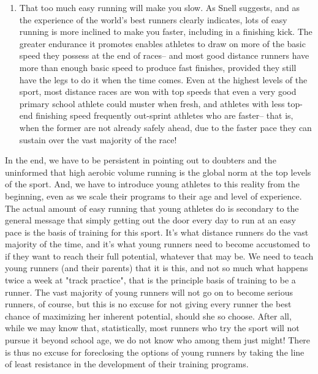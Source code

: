 \begin{enumerate}
    \item That too much easy running will make you slow. As Snell suggests, and as the experience of the world's best runners clearly indicates, lots of easy running is more inclined to make you faster, including in a finishing kick. The greater endurance it promotes enables athletes to draw on more of the basic speed they possess at the end of races-- and most good distance runners have more than enough basic speed to produce fast finishes, provided they still have the legs to do it when the time comes. Even at the highest levels of the sport, most distance races are won with top speeds that even a very good primary school athlete could muster when fresh, and athletes with less top-end finishing speed frequently out-sprint athletes who are faster-- that is, when the former are not already safely ahead, due to the faster pace they can sustain over the vast majority of the race!
\end{enumerate}

In the end, we have to be persistent in pointing out to doubters and the uninformed that high aerobic volume running is the global norm at the top levels of the sport. And, we have to introduce young athletes to this reality from the beginning, even as we scale their programs to their age and level of experience. The actual amount of easy running that young athletes do is secondary to the general message that simply getting out the door every day to run at an easy pace is the basis of training for this sport. It's what distance runners do the vast majority of the time, and it's what young runners need to become accustomed to if they want to reach their full potential, whatever that may be. We need to teach young runners (and their parents) that it is this, and not so much what happens twice a week at "track practice", that is the principle basis of training to be a runner. The vast majority of young runners will not go on to become serious runners, of course, but this is no excuse for not giving every runner the best chance of maximizing her inherent potential, should she so choose. After all, while we may know that, statistically, most runners who try the sport will not pursue it beyond school age, we do not know who among them just might! There is thus no excuse for foreclosing the options of young runners by taking the line of least resistance in the development of their training programs.
